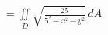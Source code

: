 \documentclass[preview]{standalone}
\begin{document}
\begin{align*}
= \iint\limits_D \sqrt{\frac{25}{5^2-x^2-y^2}}\, dA
\end{align*}
\end{document}
